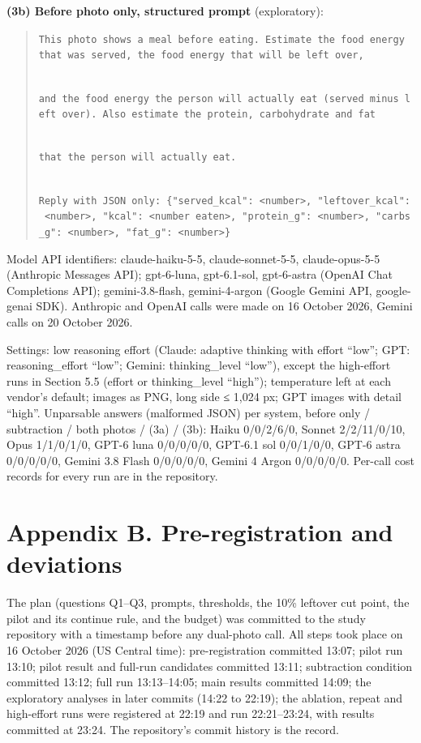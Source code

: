 \documentclass[
  11pt,
  letterpaper]{article}
\begin{document}
\textbf{(3b) Before photo only, structured prompt} (exploratory):

\begin{quote}
\texttt{This\ photo\ shows\ a\ meal\ before\ eating.\ Estimate\ the\ food\ energy\ that\ was\ served,\ the\ food\ energy\ that\ will\ be\ left\ over,}\strut \\
\texttt{and\ the\ food\ energy\ the\ person\ will\ actually\ eat\ (served\ minus\ left\ over).\ Also\ estimate\ the\ protein,\ carbohydrate\ and\ fat}\strut \\
\texttt{that\ the\ person\ will\ actually\ eat.}\strut \\
\texttt{Reply\ with\ JSON\ only:\ \{"served\_kcal":\ \textless{}number\textgreater{},\ "leftover\_kcal":\ \textless{}number\textgreater{},\ "kcal":\ \textless{}number\ eaten\textgreater{},\ "protein\_g":\ \textless{}number\textgreater{},\ "carbs\_g":\ \textless{}number\textgreater{},\ "fat\_g":\ \textless{}number\textgreater{}\}}
\end{quote}

Model API identifiers: claude-haiku-5-5, claude-sonnet-5-5, claude-opus-5-5 (Anthropic Messages API);
gpt-6-luna, gpt-6.1-sol, gpt-6-astra (OpenAI Chat Completions API); gemini-3.8-flash, gemini-4-argon (Google
Gemini API, google-genai SDK). Anthropic and OpenAI calls were made on 16 October 2026, Gemini calls on 20
October 2026.

Settings: low reasoning effort (Claude: adaptive thinking with effort ``low''; GPT: reasoning\_effort ``low'';
Gemini: thinking\_level ``low''), except the high-effort runs in Section 5.5 (effort or thinking\_level
``high''); temperature left at each vendor's default; images as PNG, long side ≤ 1,024 px; GPT images with
detail ``high''. Unparsable answers (malformed JSON) per system, before only / subtraction / both photos /
(3a) / (3b): Haiku 0/0/2/6/0, Sonnet 2/2/11/0/10, Opus 1/1/0/1/0, GPT-6 luna 0/0/0/0/0, GPT-6.1 sol 0/0/1/0/0,
GPT-6 astra 0/0/0/0/0, Gemini 3.8 Flash 0/0/0/0/0, Gemini 4 Argon 0/0/0/0/0. Per-call cost records for every
run are in the repository.

\section*{Appendix B. Pre-registration and deviations}\label{appendix-b.-pre-registration-and-deviations}

The plan (questions Q1--Q3, prompts, thresholds, the 10\% leftover cut point, the pilot and its continue rule,
and the budget) was committed to the study repository with a timestamp before any dual-photo call. All steps
took place on 16 October 2026 (US Central time): pre-registration committed 13:07; pilot run 13:10; pilot
result and full-run candidates committed 13:11; subtraction condition committed 13:12; full run 13:13--14:05;
main results committed 14:09; the exploratory analyses in later commits (14:22 to 22:19); the ablation, repeat
and high-effort runs were registered at 22:19 and run 22:21--23:24, with results committed at 23:24. The
repository's commit history is the record.
\end{document}
